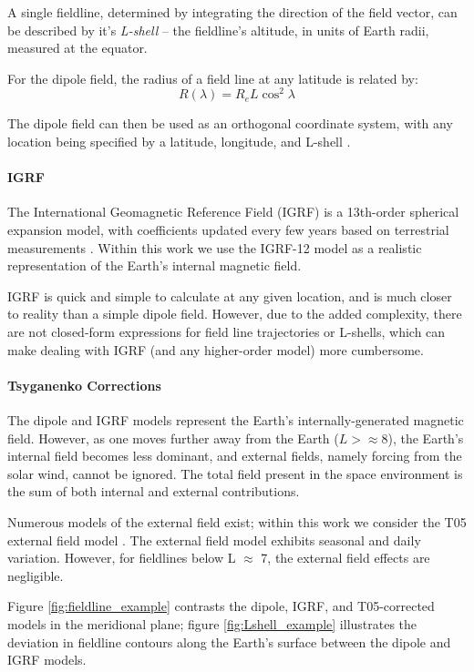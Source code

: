 A single fieldline, determined by integrating the direction of the field vector, can be described by it's \emph{L-shell} -- the fieldline's altitude, in units of Earth radii, measured at the equator. 

For the dipole field, the radius of a field line at any latitude is related by:
\begin{equation}
R(\lambda) = R_e L \cos^2 \lambda
\end{equation}


The dipole field can then be used as an orthogonal coordinate system, with any location being specified by a latitude, longitude, and L-shell \citep{McIlwain1961}. 
\paragraph{IGRF}

The International Geomagnetic Reference Field (IGRF) is a 13th-order spherical expansion model, with coefficients updated every few years based on terrestrial measurements \citep{Thebault2015}. Within this work we use the IGRF-12 model as a realistic representation of the Earth's internal magnetic field.

IGRF is quick and simple to calculate at any given location, and is much closer to reality than a simple dipole field. However, due to the added complexity, there are not closed-form expressions for field line trajectories or L-shells, which can make dealing with IGRF (and any higher-order model) more cumbersome.

\paragraph{Tsyganenko Corrections}
The dipole and IGRF models represent the Earth's internally-generated magnetic field. However, as one moves further away from the Earth ($L > \approx 8$), the Earth's internal field becomes less dominant, and external fields, namely forcing from the solar wind, cannot be ignored. The total field present in the space environment is the sum of both internal and external contributions.

Numerous models of the external field exist; within this work we consider the T05 external field model \citep{Tsyganenko2005}. The external field model exhibits seasonal and daily variation. However, for fieldlines below L $\approx$ 7, the external field effects are negligible. 

Figure \ref{fig:fieldline_example} contrasts the dipole, IGRF, and T05-corrected models in the meridional plane; figure \ref{fig:Lshell_example} illustrates the deviation in fieldline contours along the Earth's surface between the dipole and IGRF models.

